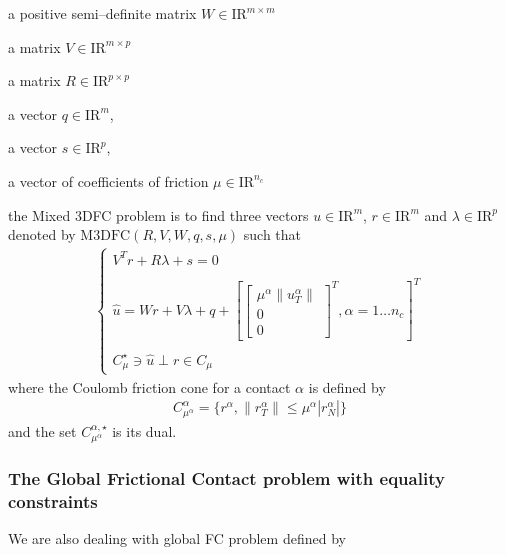 \begin{DoxyItemize}
\item a positive semi--definite matrix ${W} \in {\mathrm{I\!R}}^{m \times m}$ 
\item a matrix ${V} \in {\mathrm{I\!R}}^{m \times p}$ 
\item a matrix ${R} \in {\mathrm{I\!R}}^{p \times p}$ 
\item a vector $q \in {\mathrm{I\!R}}^{m}$, 
\item a vector $s \in {\mathrm{I\!R}}^{p}$, 
\item a vector of coefficients of friction $\mu \in {\mathrm{I\!R}}^{n_c}$ 
\end{DoxyItemize}the Mixed 3\-D\-F\-C problem is to find three vectors $u\in{\mathrm{I\!R}}^m$, $r\in {\mathrm{I\!R}}^m$ and $\lambda \in {\mathrm{I\!R}}^p$ denoted by $\mathrm{M3DFC}(R,V,W,q,s,\mu)$ such that \begin{eqnarray*}\label{eq:lcp1} \begin{cases} V^T {r} + R \lambda + s = 0 \\ \\ \hat u = W {r} + V\lambda + q +\left[ \left[\begin{array}{c} \mu^\alpha \|u^\alpha_T\|\\ 0 \\ 0 \end{array}\right]^T, \alpha = 1 \ldots n_c \right]^T \\ \\ C^\star_{\mu} \ni {\hat u} \perp r \in C_{\mu} \end{cases} \end{eqnarray*} where the Coulomb friction cone for a contact $\alpha$ is defined by \begin{eqnarray*} \label{eq:CCC} C_{\mu^\alpha}^{\alpha} = \{r^\alpha, \|r^\alpha_T \| \leq \mu^\alpha |r^\alpha_N| \} \end{eqnarray*} and the set $C^{\alpha,\star}_{\mu^\alpha}$ is its dual. \hypertarget{index_globalfclib}{}\subsubsection{The Global Frictional Contact problem with equality constraints}\label{index_globalfclib}
We are also dealing with global F\-C problem defined by

